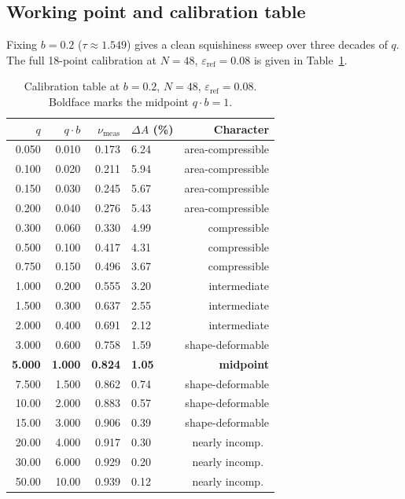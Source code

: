 \documentclass[aps,pre,twocolumn,floatfix,longbibliography]{revtex4-2}
\newcommand{\numes}{\nu_{\mathrm{meas}}}
\newcommand{\dA}{\Delta A}
\newcommand{\eref}{\varepsilon_{\mathrm{ref}}}
\begin{document}
\subsection{Working point and calibration table}

Fixing $b = 0.2$ ($\tau \approx 1.549$) gives a clean squishiness sweep over
three decades of $q$.  The full 18-point calibration at $N = 48$, $\eref = 0.08$
is given in Table~\ref{tab:calib18}.

\begin{table}[htb]
\caption{Calibration table at $b = 0.2$, $N = 48$, $\eref = 0.08$.
  Boldface marks the midpoint $q \cdot b = 1$.}
\label{tab:calib18}
\begin{ruledtabular}
\begin{tabular}{rrrlr}
  $q$ & $q\cdot b$ & $\numes$ & $\dA$ (\%) & Character \\
\hline
  0.050 & 0.010 & 0.173 & 6.24 & area-compressible \\
  0.100 & 0.020 & 0.211 & 5.94 & area-compressible \\
  0.150 & 0.030 & 0.245 & 5.67 & area-compressible \\
  0.200 & 0.040 & 0.276 & 5.43 & area-compressible \\
  0.300 & 0.060 & 0.330 & 4.99 & compressible \\
  0.500 & 0.100 & 0.417 & 4.31 & compressible \\
  0.750 & 0.150 & 0.496 & 3.67 & compressible \\
  1.000 & 0.200 & 0.555 & 3.20 & intermediate \\
  1.500 & 0.300 & 0.637 & 2.55 & intermediate \\
  2.000 & 0.400 & 0.691 & 2.12 & intermediate \\
  3.000 & 0.600 & 0.758 & 1.59 & shape-deformable \\
  \textbf{5.000} & \textbf{1.000} & \textbf{0.824} & \textbf{1.05} & \textbf{midpoint} \\
  7.500 & 1.500 & 0.862 & 0.74 & shape-deformable \\
  10.00 & 2.000 & 0.883 & 0.57 & shape-deformable \\
  15.00 & 3.000 & 0.906 & 0.39 & shape-deformable \\
  20.00 & 4.000 & 0.917 & 0.30 & nearly incomp.\ \\
  30.00 & 6.000 & 0.929 & 0.20 & nearly incomp.\ \\
  50.00 & 10.00 & 0.939 & 0.12 & nearly incomp.\ \\
\end{tabular}
\end{ruledtabular}
\end{table}
\end{document}
